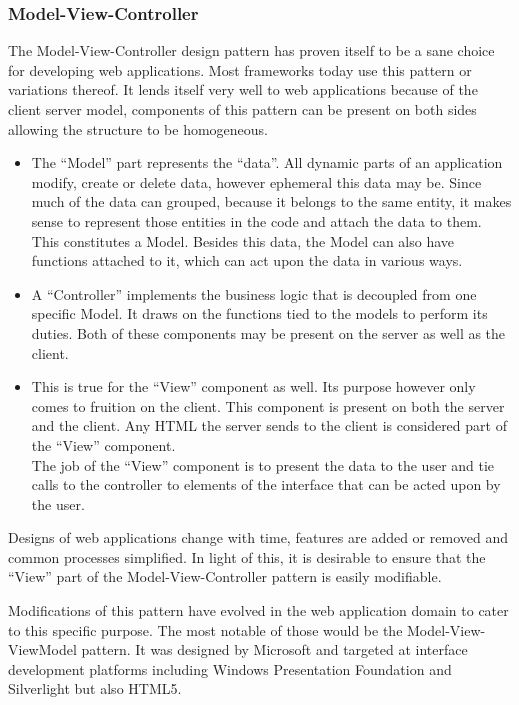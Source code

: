 \documentclass[thesis.tex]{subfiles}
\begin{document}
\subsubsection{Model-View-Controller}
The Model-View-Controller design pattern has proven itself to be a sane
choice for developing web applications. Most frameworks today use this
pattern or variations thereof.
It lends itself very well to web applications because of the client server
model, components of this pattern can be present on both sides allowing the
structure to be homogeneous.

\begin{itemize}
	\item The ``Model'' part represents the ``data''. All dynamic parts of an
	application modify, create or delete data, however ephemeral this data may
	be. Since much of the data can grouped, because it belongs to the same
	entity, it makes sense to represent those entities in the code and
	attach the data to them. This constitutes a Model. Besides this data,
	the Model can also have functions attached to it, which can act upon the data
	in various ways.
	\item A ``Controller'' implements the business logic that is decoupled from one
	specific Model. It draws on the functions tied to the models to perform its
	duties. Both of these components may be present on the server as well
	as the client.
	\item This is true for the ``View'' component as well. Its purpose however only
	comes to fruition on the client. This component is present on both the server
	and the client. Any HTML the server sends to the client is considered part of
	the ``View'' component.\\
	The job of the ``View'' component is to present the data to the user and
	tie calls to the controller to elements of the interface that can be acted
	upon by the user.
\end{itemize}

Designs of web applications change with time, features are added or
removed and common processes simplified. In light of this, it is
desirable to ensure that the ``View'' part of the Model-View-Controller
pattern is easily modifiable.

Modifications of this pattern have evolved in the web application domain to
cater to this specific purpose. The most notable of those would be the
Model-View-ViewModel pattern. It was designed by Microsoft and targeted at
interface development platforms including Windows Presentation Foundation and
Silverlight but also HTML5.
\end{document}
